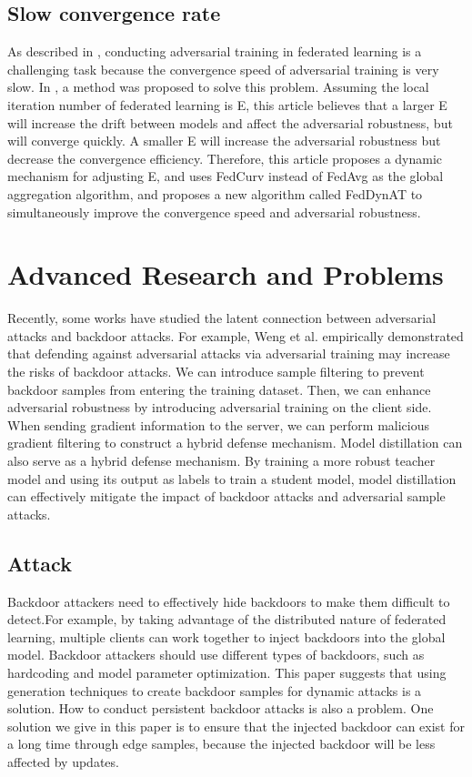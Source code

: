 \documentclass[conference]{IEEEtran}
\begin{document}
\subsection{Slow convergence rate}
As described in \cite{b34}, conducting adversarial training in federated learning is a challenging task because the convergence speed of adversarial training is very slow.
In \cite{b107}, a method was proposed to solve this problem.
Assuming the local iteration number of federated learning is E, this article believes that a larger E will
increase the drift between models and affect the adversarial robustness, but will converge quickly. A smaller
E will increase the adversarial robustness but decrease the convergence efficiency. Therefore, this article
proposes a dynamic mechanism for adjusting E, and uses FedCurv instead of FedAvg as the global aggregation
algorithm, and proposes a new algorithm called FedDynAT to simultaneously improve the convergence
speed and adversarial robustness.


\section{Advanced Research and Problems}

Recently, some works have studied the latent connection between adversarial attacks and backdoor attacks.
For example, Weng et al. \cite{b66}empirically demonstrated that defending
against adversarial attacks via adversarial training may increase the risks of backdoor attacks.
We can introduce sample filtering to prevent backdoor samples from entering the training dataset. 
Then, we can enhance adversarial robustness by introducing adversarial training on the client side. 
When sending gradient information to the server, we can perform malicious gradient filtering to construct a hybrid defense mechanism.
Model distillation can also serve as a hybrid defense mechanism. 
By training a more robust teacher model and using its output as labels to train a student model, 
model distillation can effectively mitigate the impact of backdoor attacks and adversarial sample attacks.
\subsection{Attack}  
Backdoor attackers need to effectively hide backdoors to make them difficult to detect.For example, by taking 
advantage of the distributed nature of federated learning, multiple clients can work together to inject backdoors into the global model.
Backdoor attackers should use different types of backdoors, such as hardcoding and model parameter optimization.  
This paper suggests that using generation techniques to create backdoor samples for dynamic attacks is a solution.
How to conduct persistent backdoor attacks is also a problem. 
One solution we give in this paper is to ensure that the injected backdoor can exist for a long time through edge samples, 
because the injected backdoor will be less affected by updates.
\end{document}
